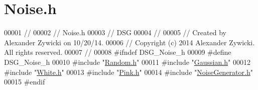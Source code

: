 \hypertarget{_noise_8h_source}{\section{Noise.\+h}
\label{_noise_8h_source}
}

\begin{DoxyCode}
00001 \textcolor{comment}{//}
00002 \textcolor{comment}{//  Noise.h}
00003 \textcolor{comment}{//  DSG}
00004 \textcolor{comment}{//}
00005 \textcolor{comment}{//  Created by Alexander Zywicki on 10/20/14.}
00006 \textcolor{comment}{//  Copyright (c) 2014 Alexander Zywicki. All rights reserved.}
00007 \textcolor{comment}{//}
00008 \textcolor{preprocessor}{#ifndef DSG\_Noise\_h}
00009 \textcolor{preprocessor}{#define DSG\_Noise\_h}
00010 \textcolor{preprocessor}{#include "\hyperlink{_random_8h}{Random.h}"}
00011 \textcolor{preprocessor}{#include "\hyperlink{_gaussian_8h}{Gaussian.h}"}
00012 \textcolor{preprocessor}{#include "\hyperlink{_white_8h}{White.h}"}
00013 \textcolor{preprocessor}{#include "\hyperlink{_pink_8h}{Pink.h}"}
00014 \textcolor{preprocessor}{#include "\hyperlink{_noise_generator_8h}{NoiseGenerator.h}"}
00015 \textcolor{preprocessor}{#endif}
\end{DoxyCode}
